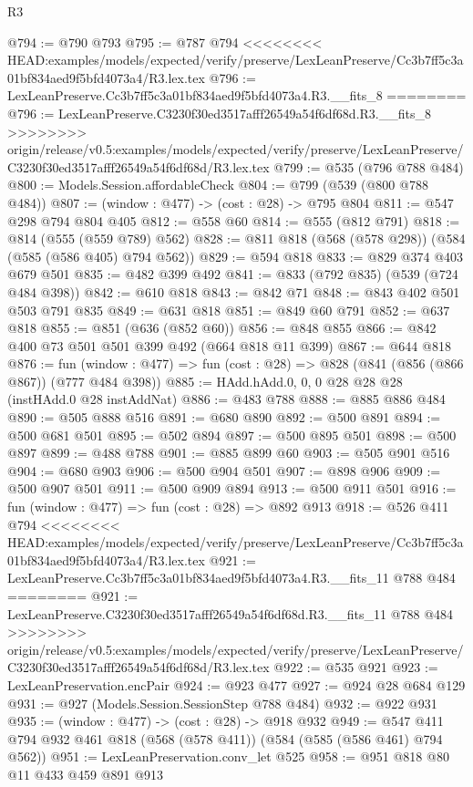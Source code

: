\begin{lexlean}{R3}
\begin{coremodule}
{{{{{{{{{{{{{{{{{{{{{{{{{{@794 := @790 @793
@795 := @787 @794
<<<<<<<< HEAD:examples/models/expected/verify/preserve/LexLeanPreserve/Cc3b7ff5c3a01bf834aed9f5bfd4073a4/R3.lex.tex
@796 := LexLeanPreserve.Cc3b7ff5c3a01bf834aed9f5bfd4073a4.R3.__fits_8
========
@796 := LexLeanPreserve.C3230f30ed3517afff26549a54f6df68d.R3.__fits_8
>>>>>>>> origin/release/v0.5:examples/models/expected/verify/preserve/LexLeanPreserve/C3230f30ed3517afff26549a54f6df68d/R3.lex.tex
@799 := @535 (@796 @788 @484)
@800 := Models.Session.affordableCheck
@804 := @799 (@539 (@800 @788 @484))
@807 := (window : @477) -> (cost : @28) -> @795 @804
@811 := @547 @298 @794 @804 @405
@812 := @558 @60
@814 := @555 (@812 @791)
@818 := @814 (@555 (@559 @789) @562)
@828 := @811 @818 (@568 (@578 @298)) (@584 (@585 (@586 @405) @794 @562))
@829 := @594 @818
@833 := @829 @374 @403 @679 @501
@835 := @482 @399 @492
@841 := @833 (@792 @835) (@539 (@724 @484 @398))
@842 := @610 @818
@843 := @842 @71
@848 := @843 @402 @501 @503 @791 @835
@849 := @631 @818
@851 := @849 @60 @791
@852 := @637 @818
@855 := @851 (@636 (@852 @60))
@856 := @848 @855
@866 := @842 @400 @73 @501 @501 @399 @492 (@664 @818 @11 @399)
@867 := @644 @818
@876 := fun (window : @477) => fun (cost : @28) => @828 (@841 (@856 (@866 @867)) (@777 @484 @398))
@885 := HAdd.hAdd.{0, 0, 0} @28 @28 @28 (instHAdd.{0} @28 instAddNat)
@886 := @483 @788
@888 := @885 @886 @484
@890 := @505 @888 @516
@891 := @680 @890
@892 := @500 @891
@894 := @500 @681 @501
@895 := @502 @894
@897 := @500 @895 @501
@898 := @500 @897
@899 := @488 @788
@901 := @885 @899 @60
@903 := @505 @901 @516
@904 := @680 @903
@906 := @500 @904 @501
@907 := @898 @906
@909 := @500 @907 @501
@911 := @500 @909 @894
@913 := @500 @911 @501
@916 := fun (window : @477) => fun (cost : @28) => @892 @913
@918 := @526 @411 @794
<<<<<<<< HEAD:examples/models/expected/verify/preserve/LexLeanPreserve/Cc3b7ff5c3a01bf834aed9f5bfd4073a4/R3.lex.tex
@921 := LexLeanPreserve.Cc3b7ff5c3a01bf834aed9f5bfd4073a4.R3.__fits_11 @788 @484
========
@921 := LexLeanPreserve.C3230f30ed3517afff26549a54f6df68d.R3.__fits_11 @788 @484
>>>>>>>> origin/release/v0.5:examples/models/expected/verify/preserve/LexLeanPreserve/C3230f30ed3517afff26549a54f6df68d/R3.lex.tex
@922 := @535 @921
@923 := LexLeanPreservation.encPair
@924 := @923 @477
@927 := @924 @28 @684 @129
@931 := @927 (Models.Session.SessionStep @788 @484)
@932 := @922 @931
@935 := (window : @477) -> (cost : @28) -> @918 @932
@949 := @547 @411 @794 @932 @461 @818 (@568 (@578 @411)) (@584 (@585 (@586 @461) @794 @562))
@951 := LexLeanPreservation.conv_let @525
@958 := @951 @818 @80 @11 @433 @459 @891 @913
}}}}}}}}}}}}}}}}}}}}}}}}}}
\end{coremodule}
\end{lexlean}
